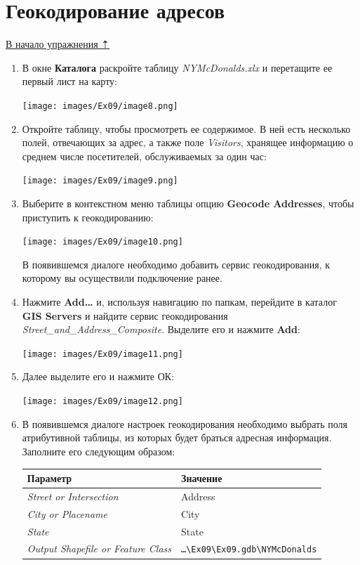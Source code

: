 \documentclass[12pt,]{book}
\begin{document}
\hypertarget{geocoding-addresses}{%
\section{Геокодирование адресов}\label{geocoding-addresses}}

\protect\hyperlink{geocoding}{В начало упражнения ⇡}

\begin{enumerate}
\def\labelenumi{\arabic{enumi}.}
\item
  В окне \textbf{Каталога} раскройте таблицу \emph{NYMcDonalds.xlx} и перетащите ее первый лист на карту:

  \texttt{[image: images/Ex09/image8.png]}
\item
  Откройте таблицу, чтобы просмотреть ее содержимое. В ней есть несколько полей, отвечающих за адрес, а также поле \emph{Visitors}, хранящее информацию о среднем числе посетителей, обслуживаемых за один час:

  \texttt{[image: images/Ex09/image9.png]}
\item
  Выберите в контекстном меню таблицы опцию \textbf{Geocode Addresses}, чтобы приступить к геокодированию:

  \texttt{[image: images/Ex09/image10.png]}

  В появившемся диалоге необходимо добавить сервис геокодирования, к которому вы осуществили подключение ранее.
\item
  Нажмите \textbf{Add\ldots{}} и, используя навигацию по папкам, перейдите в каталог \textbf{GIS Servers} и найдите сервис геокодирования \emph{Street\_and\_Address\_Composite}. Выделите его и нажмите \textbf{Add}:

  \texttt{[image: images/Ex09/image11.png]}
\item
  Далее выделите его и нажмите ОК:

  \texttt{[image: images/Ex09/image12.png]}
\item
  В появившемся диалоге настроек геокодирования необходимо выбрать поля атрибутивной таблицы, из которых будет браться адресная информация. Заполните его следующим образом:

  \begin{longtable}[]{@{}ll@{}}
  \toprule
  Параметр & Значение\tabularnewline
  \midrule
  \endhead
  \emph{Street or Intersection} & Address\tabularnewline
  \emph{City or Placename} & City\tabularnewline
  \emph{State} & State\tabularnewline
  \emph{Output Shapefile or Feature Class} & \texttt{\ldots{}\textbackslash{}Ex09\textbackslash{}Ex09.gdb\textbackslash{}NYMcDonalds}\tabularnewline
  \bottomrule
  \end{longtable}


\end{enumerate}
\end{document}
